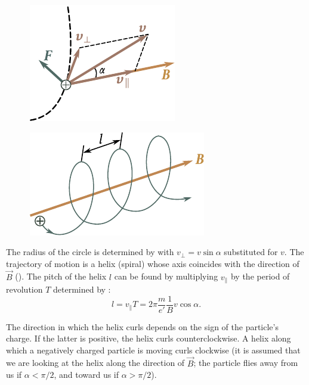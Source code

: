 \begin{figure}[t]
	\begin{minipage}[t]{0.48\linewidth}
		\begin{center}
			\includegraphics[scale=1]{figures/ch_10/fig_10_1.pdf}
			\caption[]{}
			\label{fig:10_1}
		\end{center}
	\end{minipage}
	\hfill{ }%
	\begin{minipage}[t]{0.48\linewidth}
		\begin{center}
			\includegraphics[scale=1]{figures/ch_10/fig_10_2.pdf}
			\caption[]{}
			\label{fig:10_2}
		\end{center}
	\end{minipage}
\vspace{-0.4cm}
\end{figure}

The radius of the circle is determined by  with $v_{\perp} = v\sin\alpha$ substituted for $v$.
The trajectory of motion is a helix (spiral) whose axis coincides with the direction of $\vec{B}$ ().
The pitch of the helix $l$ can be found by multiplying $v_{\parallel}$ by the period of revolution $T$ determined by :
\begin{equation}\label{eq:10_4}
    l = v_{\parallel} T = 2\pi \frac{m}{e'} \frac{1}{B} v \cos\alpha.
\end{equation}

The direction in which the helix curls depends on the sign of the particle's charge.
If the latter is positive, the helix curls counterclockwise.
A helix along which a negatively charged particle is moving curls clockwise (it is assumed that we are looking at the helix along the direction of $\vec{B}$; the particle flies away from us if $\alpha<\pi/2$, and toward us if $\alpha>\pi/2$).

